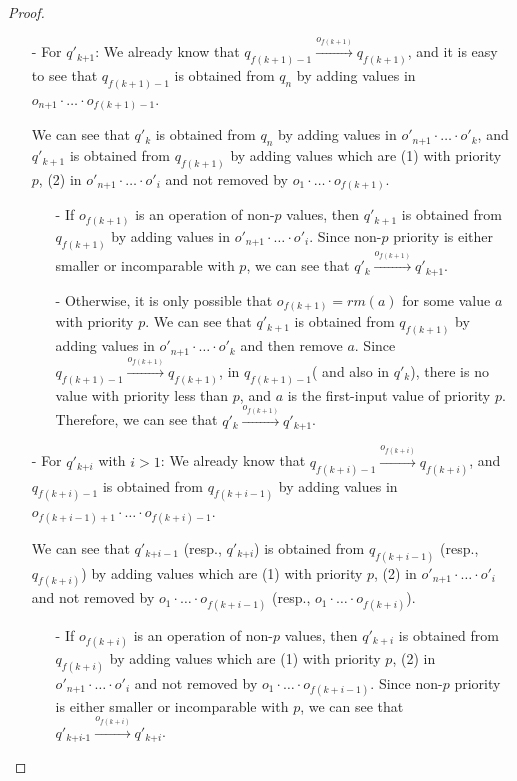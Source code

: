 \begin {proof}
\begin{itemize}
\item[-] For $q'_{\textit{k+1}}$: We already know that $q_{f(k+1)-1} \xrightarrow{o_{f(k+1)}} q_{f(k+1)}$, and it is easy to see that $q_{f(k+1)-1}$ is obtained from $q_n$ by adding values in $o_{\textit{n+1}} \cdot \ldots \cdot o_{f(k+1)-1}$.

    We can see that $q'_k$ is obtained from $q_n$ by adding values in $o'_{\textit{n+1}} \cdot \ldots \cdot o'_k$, and $q'_{k+1}$ is obtained from $q_{f(k+1)}$ by adding values which are (1) with priority $p$, (2) in $o'_{\textit{n+1}} \cdot \ldots \cdot o'_i$ and not removed by $o_1 \cdot \ldots \cdot o_{f(k+1)}$.

    \begin{itemize}
    \setlength{\itemsep}{0.5pt}
    \item[-] If $o_{f(k+1)}$ is an operation of non-$p$ values, then $q'_{k+1}$ is obtained from $q_{f(k+1)}$ by adding values in $o'_{\textit{n+1}} \cdot \ldots \cdot o'_i$. Since non-$p$ priority is either smaller or incomparable with $p$, we can see that $q'_k \xrightarrow{o_{f(k+1)}} q'_{\textit{k+1}}$.

    \item[-] Otherwise, it is only possible that $o_{f(k+1)} = \textit{rm}(a)$ for some value $a$ with priority $p$. We can see that $q'_{k+1}$ is obtained from $q_{f(k+1)}$ by adding values in $o'_{\textit{n+1}} \cdot \ldots \cdot o'_k$ and then remove $a$. Since $q_{f(k+1)-1} \xrightarrow{o_{f(k+1)}} q_{f(k+1)}$, in $q_{f(k+1)-1}$( and also in $q'_k$), there is no value with priority less than $p$, and $a$ is the first-input value of priority $p$. Therefore, we can see that $q'_k \xrightarrow{o_{f(k+1)}} q'_{\textit{k+1}}$.
    \end{itemize}

\item[-] For $q'_{\textit{k+i}}$ with $i>1$: We already know that $q_{f(k+i)-1} \xrightarrow{o_{f(k+i)}} q_{f(k+i)}$, and $q_{f(k+i)-1}$ is obtained from $q_{f(k+i-1)}$ by adding values in $o_{f(k+i-1)+1} \cdot \ldots \cdot o_{f(k+i)-1}$.

    We can see that $q'_{\textit{k+i}-1}$ (resp., $q'_{\textit{k+i}}$) is obtained from $q_{f(k+i-1)}$ (resp., $q_{f(k+i)}$) by adding values which are (1) with priority $p$, (2) in $o'_{\textit{n+1}} \cdot \ldots \cdot o'_i$ and not removed by $o_1 \cdot \ldots \cdot o_{f(k+i-1)}$ (resp., $o_1 \cdot \ldots \cdot o_{f(k+i)}$).

    \begin{itemize}
    \setlength{\itemsep}{0.5pt}
    \item[-] If $o_{f(k+i)}$ is an operation of non-$p$ values, then $q'_{k+i}$ is obtained from $q_{f(k+i)}$ by adding values which are (1) with priority $p$, (2) in $o'_{\textit{n+1}} \cdot \ldots \cdot o'_i$ and not removed by $o_1 \cdot \ldots \cdot o_{f(k+i-1)}$. Since non-$p$ priority is either smaller or incomparable with $p$, we can see that $q'_{\textit{k+i-1}} \xrightarrow{o_{f(k+i)}} q'_{\textit{k+i}}$.


\end{itemize}
\end{itemize}
\end{proof}
